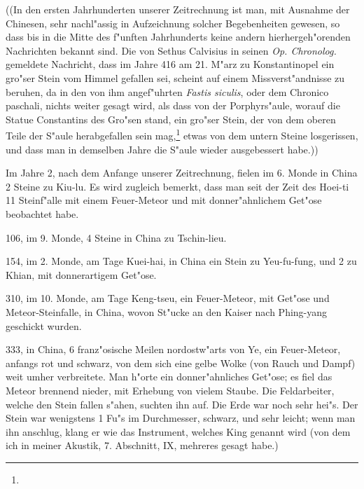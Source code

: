 \documentclass[a4paper, 11pt, oneside, polutonikogreek, german]{article}
\begin{document}
((In den ersten Jahrhunderten unserer Zeitrechnung ist man, mit Ausnahme der Chinesen, sehr nachl"assig in Aufzeichnung solcher Begebenheiten gewesen, so dass bis in die Mitte des f"unften Jahrhunderts keine andern hierhergeh"orenden Nachrichten bekannt sind. Die von Sethus Calvisius in seinen \emph{Op. Chronolog.} gemeldete Nachricht, dass im Jahre 416 am 21. M"arz zu Konstantinopel ein gro"ser Stein vom Himmel gefallen sei, scheint auf einem Missverst"andnisse zu beruhen, da in den von ihm angef"uhrten \emph{Fastis siculis}, oder dem Chronico paschali, nichts weiter gesagt wird, als dass von der Porphyrs"aule, worauf die Statue Constantins des Gro"sen stand, ein gro"ser Stein, der von dem oberen Teile der S"aule herabgefallen sein mag,\footnote{} etwas von dem untern Steine losgerissen, und dass man in demselben Jahre die S"aule wieder ausgebessert habe.))

Im Jahre 2, nach dem Anfange unserer Zeitrechnung, fielen im 6. Monde in China 2 Steine zu Kiu-lu. Es wird zugleich bemerkt, dass man seit der Zeit des Hoei-ti 11 Steinf"alle mit einem Feuer-Meteor und mit donner"ahnlichem Get"ose beobachtet habe.

106, im 9. Monde, 4 Steine in China zu Tschin-lieu.

154, im 2. Monde, am Tage Kuei-hai, in China ein Stein zu Yeu-fu-fung, und 2 zu Khian, mit donnerartigem Get"ose.

310, im 10. Monde, am Tage Keng-tseu, ein Feuer-Meteor, mit Get"ose und Meteor-Steinfalle, in China, wovon St"ucke an den Kaiser nach Phing-yang geschickt wurden.

333, in China, 6 franz"osische Meilen nordostw"arts von Ye, ein Feuer-Meteor, anfangs rot und schwarz, von dem sich eine gelbe Wolke (von Rauch und Dampf) weit umher verbreitete. Man h"orte ein donner"ahnliches Get"ose; es fiel das Meteor brennend nieder, mit Erhebung von vielem Staube. Die Feldarbeiter, welche den Stein fallen s"ahen, suchten ihn auf. Die Erde war noch sehr hei"s. Der Stein war wenigstens 1 Fu"s im Durchmesser, schwarz, und sehr leicht; wenn man ihn anschlug, klang er wie das Instrument, welches King genannt wird (von dem ich in meiner Akustik, 7. Abschnitt, IX, mehreres gesagt habe.)
\end{document}
